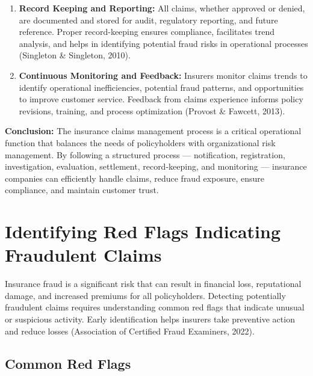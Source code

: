 \documentclass[12pt,a4paper]{article}
\begin{document}
\begin{enumerate}
    \item \textbf{Record Keeping and Reporting:} All claims, whether approved or denied, are documented and stored for audit, regulatory reporting, and future reference. Proper record-keeping ensures compliance, facilitates trend analysis, and helps in identifying potential fraud risks in operational processes (Singleton \& Singleton, 2010).
    \item \textbf{Continuous Monitoring and Feedback:} Insurers monitor claims trends to identify operational inefficiencies, potential fraud patterns, and opportunities to improve customer service. Feedback from claims experience informs policy revisions, training, and process optimization (Provost \& Fawcett, 2013).
\end{enumerate}

\begin{example}
\textbf{Conclusion:} The insurance claims management process is a critical operational function that balances the needs of policyholders with organizational risk management. By following a structured process --- notification, registration, investigation, evaluation, settlement, record-keeping, and monitoring --- insurance companies can efficiently handle claims, reduce fraud exposure, ensure compliance, and maintain customer trust.
\end{example}

\section{Identifying Red Flags Indicating Fraudulent Claims}

Insurance fraud is a significant risk that can result in financial loss, reputational damage, and increased premiums for all policyholders. Detecting potentially fraudulent claims requires understanding common red flags that indicate unusual or suspicious activity. Early identification helps insurers take preventive action and reduce losses (Association of Certified Fraud Examiners, 2022).

\subsection{Common Red Flags}
\end{document}
